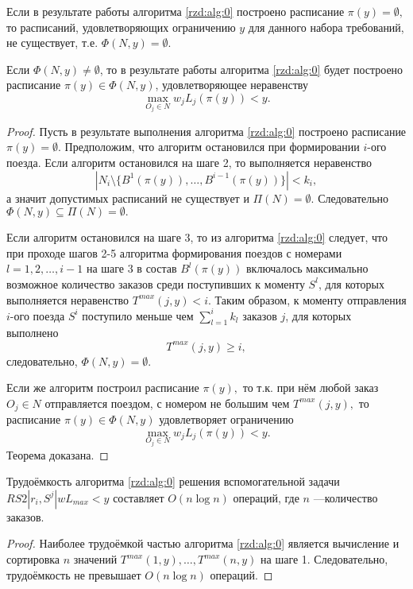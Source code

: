 \begin{theorem}\label{rzd:th:0}
Если в результате работы алгоритма \ref{rzd:alg:0} построено расписание $\pi(y)= \emptyset,$ то расписаний, удовлетворяющих ограничению $y$ для данного набора требований, не существует, т.е. $\Phi(N,y) = \emptyset$.

Если $\Phi(N, y) \neq \emptyset$, то в результате работы алгоритма \ref{rzd:alg:0} будет построено расписание $\pi(y) \in \Phi(N,y)$, удовлетворяющее неравенству
$$\max\limits_{O_j\in N}w_j L_j(\pi(y)) < y.$$
\end{theorem}
\begin{proof}
Пусть в результате выполнения алгоритма \ref{rzd:alg:0} построено расписание $\pi(y) = \emptyset$.
Предположим, что алгоритм остановился при формировании $i$-ого поезда. Если алгоритм остановился на шаге 2, то выполняется неравенство
$$|N_i \setminus \{B^1(\pi(y)),\dots, B^{i-1}(\pi(y))\}| < k_i,$$
а значит допустимых расписаний не существует и $\Pi(N) = \emptyset$. Следовательно $\Phi(N, y) \subseteq \Pi(N) = \emptyset.$

Если алгоритм остановился на шаге 3, то из алгоритма \ref{rzd:alg:0} следует, что при проходе шагов 2-5 алгоритма формирования поездов с номерами $l = 1, 2, \dots, i-1$ на шаге 3 в состав $B^l(\pi(y))$ включалось максимально возможное количество заказов
среди поступивших к моменту $S^l$, для которых выполняется неравенство
$T^{max}({j},y) < i.$
Таким образом, к моменту отправления $i$-ого поезда $S^i$ поступило меньше чем $\sum\limits_{l=1}^i k_l$ заказов $j$, для которых выполнено
$$T^{max}({j},y) \geq i,$$
следовательно, $\Phi(N,y) = \emptyset.$

Если же алгоритм построил расписание $\pi(y),$ то т.к. при нём любой заказ $O_j \in N$ отправляется поездом, с номером не большим чем $T^{max}(j,y),$ то расписание $\pi(y) \in \Phi(N,y)$ удовлетворяет ограничению
$$\max\limits_{O_j\in N}w_j L_j(\pi(y)) < y.$$
Теорема доказана.
\end{proof}
\begin{lemma}\label{rzd:lm:0}
Трудоёмкость алгоритма \ref{rzd:alg:0} решения вспомогательной задачи $RS2|r_i, S^j|wL_{max} < y$ составляет $O(n \log n)$ операций, где $n$ ---количество заказов.
\end{lemma}
\begin{proof}
Наиболее трудоёмкой частью алгоритма \ref{rzd:alg:0} является вычисление и сортировка $n$ значений $T^{max}(1, y), \dots, T^{max}(n, y)$ на шаге 1. Следовательно, трудоёмкость не превышает $O(n \log n)$ операций.
\end{proof}

